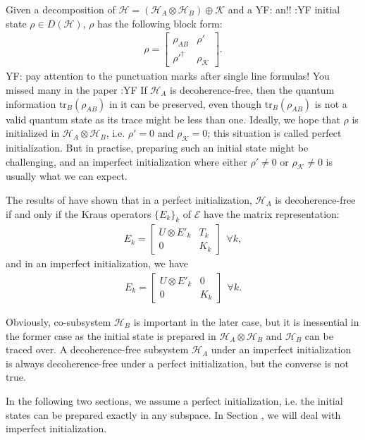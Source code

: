 \documentclass[journal]{IEEEtran}
\def\h{\ensuremath{\mathcal{H}}}
\def\k{\ensuremath{\mathcal{K}}}
\def\e{\ensuremath{\mathcal{E}}}
\def\k{\mathcal{K}}
\newcommand{\authorComment}[3]{\color{#1}#2: {#3} :#2\color{black}}
\newcommand{\yf}[1]{\authorComment{blue}{YF}{#1}}
\begin{document}
Given a decomposition of $\h=(\h_A\otimes \h_B)\oplus\k$ and a \yf{an!!} initial state $\rho\in D(\h)$, $\rho$ has the following block form:
  \begin{eqnarray}
  \rho=\left[ \begin{matrix}
  \rho_{AB}&\rho'\\
  \rho'^\dagger&\rho_\k
  \end{matrix}\right].
\end{eqnarray}
\yf{pay attention to the punctuation marks after single line formulas! You missed many in the paper}
If $\h_A$ is decoherence-free, then the quantum information $\textrm{tr}_{B}(\rho_{AB})$ in it can be preserved, even though $\textrm{tr}_{B}(\rho_{AB})$ is not a valid quantum state as its  trace might be less than one. Ideally, we hope that $\rho$ is initialized in $\h_A\otimes\h_B$, i.e. $\rho'=0$ and $\rho_\k=0$; this situation is called perfect initialization. 
  But in practise,  preparing such an initial state might be challenging, and an imperfect initialization where either $\rho'\not =0$ or $\rho_\k\not =0$ is usually what we can expect.
 
  The results of \cite{shabani2005theory} have shown that in a perfect initialization, $\h_A$ is decoherence-free if and only if the Kraus operators $\{E_k\}_k$ of $\e$ have the matrix representation:
\begin{eqnarray}\label{Eq_perfect}
  E_{k}=\left [\begin{matrix}
  U\otimes E'_{k}&T_k\\
  0&K_k
\end{matrix}\right]\ \ \forall k,
\end{eqnarray}
and in an imperfect initialization, we have
\begin{eqnarray}\label{Eq_imperfect}
  E_{k}=\left [\begin{matrix}
  U\otimes E'_{k}&0\\
  0&K_k
\end{matrix}\right]\ \ \forall k.
\end{eqnarray}

Obviously, co-subsystem $\h_B$ is important in the later case, but it is inessential in the former case as the initial state is prepared in $\h_A\otimes \h_B$ and $\h_B$ can be traced over. A decoherence-free subsystem $\h_A$ under an imperfect initialization is always decoherence-free under a perfect initialization, but the converse is not true. 

In the following two sections, we assume a perfect initialization, i.e. the initial states can be prepared exactly in any subspace. In Section \uppercase\expandafter{},  we will deal with imperfect initialization.  
\end{document}
